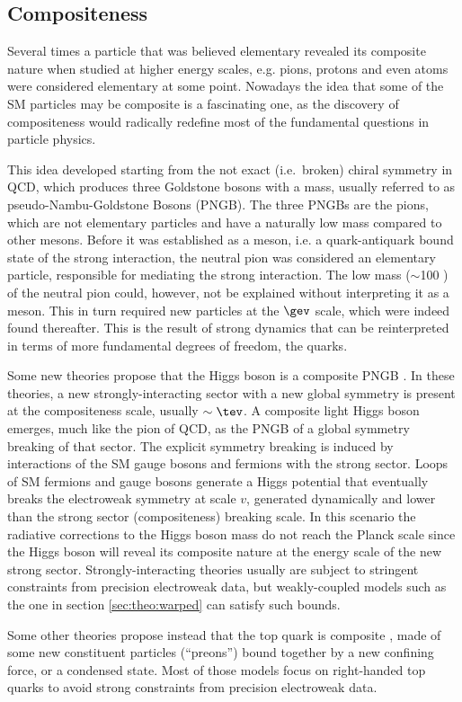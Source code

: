 \subsection{Compositeness}
\label{sec:theo:compositeness}

Several times a particle that was believed elementary revealed its composite nature when studied at higher energy scales, e.g. pions, protons and
even atoms were considered elementary at some point. Nowadays the idea that some of the SM particles may be composite is a fascinating  one, as the discovery of compositeness would radically redefine most of the fundamental questions in particle physics.\par
This idea developed starting from the not exact (i.e.~broken) chiral symmetry in QCD, which produces three Goldstone bosons with a mass, usually referred to as pseudo-Nambu-Goldstone Bosons (PNGB). The three PNGBs are the pions, which are not elementary particles and have a naturally low mass compared to other mesons. Before it was established as a meson, i.e. a quark-antiquark bound state of the strong interaction, the neutral pion was considered an elementary
particle, responsible for mediating the strong interaction. The low mass ($\sim$100 \mev) of the neutral pion could, however, not be explained without interpreting it as a meson. This in turn required new particles at the $\gev$ scale, which were indeed found thereafter. This is the result of strong dynamics that can be reinterpreted in terms of more fundamental degrees of freedom, the quarks.\par
Some new theories propose that the Higgs boson is a composite PNGB \cite{Agashe:2004rs,Kaplan1984187,Fukano:2013aea,Contino:2010rs}. In these theories, a new strongly-interacting sector with a new global symmetry is present at the compositeness scale, usually $\sim\tev$. A composite light Higgs boson emerges, much like the pion of QCD, as the PNGB of a global symmetry breaking of that sector. The explicit symmetry breaking is induced by interactions of the SM gauge bosons and fermions with the strong sector. Loops of SM fermions and gauge bosons generate a Higgs potential that eventually breaks the electroweak symmetry at scale $v$, generated dynamically and lower than the strong sector (compositeness) breaking scale. In this scenario the radiative corrections to the Higgs boson mass do not reach the Planck scale since the Higgs boson will reveal its composite nature at the energy scale of the new strong sector. Strongly-interacting theories usually are subject to stringent constraints from precision electroweak data, but weakly-coupled models such as the one in section \ref{sec:theo:warped} can satisfy such bounds. \par
Some other theories propose instead that the top quark is composite \cite{Pomarol:2008bh}, made of some new constituent particles (``preons'') bound together by a new confining force, or a condensed state. Most of those models \cite{Lillie:2007hd,Kumar:2009vs} focus on right-handed top quarks to avoid strong constraints from precision electroweak data.\\


